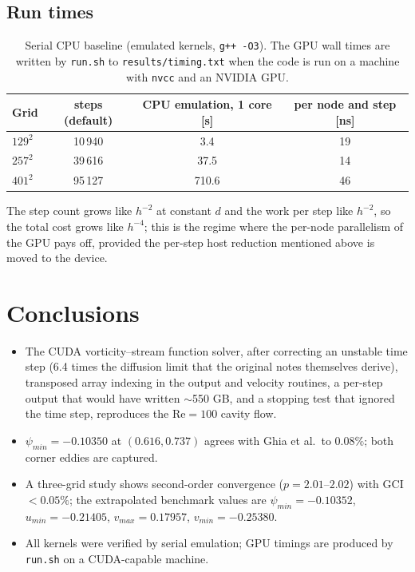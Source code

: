 \subsection{Run times}
\begin{table}[H]\centering\small
\begin{tabular}{lccc}\toprule
Grid & steps (default) & CPU emulation, 1 core [s] & per node and step [ns]\\\midrule
$129^2$ & 10\,940 & 3.4 & 19\\
$257^2$ & 39\,616 & 37.5 & 14\\
$401^2$ & 95\,127 & 710.6 & 46\\\bottomrule
\end{tabular}\caption{Serial CPU baseline (emulated kernels, \texttt{g++ -O3}). The GPU wall times are written by \texttt{run.sh} to \texttt{results/timing.txt} when the code is run on a machine with \texttt{nvcc} and an NVIDIA GPU.}\end{table}
The step count grows like $h^{-2}$ at constant $d$ and the work per step like $h^{-2}$, so the total cost grows like $h^{-4}$; this is the regime where the per-node parallelism of the GPU pays off, provided the per-step host reduction mentioned above is moved to the device.

\section{Conclusions}
\begin{itemize}
\item The CUDA vorticity--stream function solver, after correcting an unstable time step (6.4 times the diffusion limit that the original notes themselves derive), transposed array indexing in the output and velocity routines, a per-step output that would have written $\sim$550 GB, and a stopping test that ignored the time step, reproduces the $\mathrm{Re}=100$ cavity flow.
\item $\psi_{min}=-0.10350$ at $(0.616,0.737)$ agrees with Ghia et al.\ to $0.08\%$; both corner eddies are captured.
\item A three-grid study shows second-order convergence ($p=2.01$--$2.02$) with GCI $<0.05\%$; the extrapolated benchmark values are $\psi_{min}=-0.10352$, $u_{min}=-0.21405$, $v_{max}=0.17957$, $v_{min}=-0.25380$.
\item All kernels were verified by serial emulation; GPU timings are produced by \texttt{run.sh} on a CUDA-capable machine.
\end{itemize}

